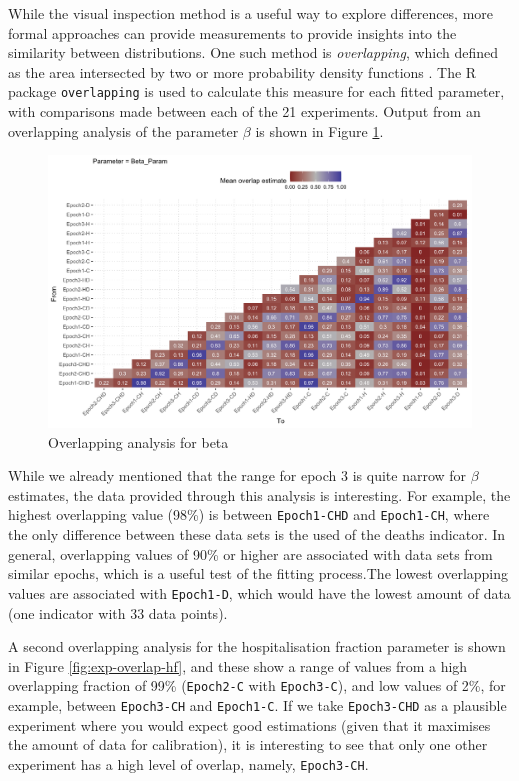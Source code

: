 \documentclass[10pt,letterpaper]{article}
\begin{document}
While the visual inspection method is a useful way to explore differences, more formal approaches can provide measurements to provide insights into the similarity between distributions. One such method is \emph{overlapping}, which deﬁned as the area intersected by two or more probability density functions \citep{10.3389/fpsyg.2019.01089}. The R package \texttt{overlapping} \citep{Pastore2018} is used to calculate this measure for each fitted parameter, with comparisons made between each of the 21 experiments. Output from an overlapping analysis of the parameter \(\beta\) is shown in Figure \ref{fig:exp-overlap-beta}.

\begin{figure}
\includegraphics[width=0.85\linewidth]{diagrams/exp_overlap_beta} \caption{Overlapping analysis for beta}\label{fig:exp-overlap-beta}
\end{figure}

While we already mentioned that the range for epoch 3 is quite narrow for \(\beta\) estimates, the data provided through this analysis is interesting. For example, the highest overlapping value (98\%) is between \texttt{Epoch1-CHD} and \texttt{Epoch1-CH}, where the only difference between these data sets is the used of the deaths indicator. In general, overlapping values of 90\% or higher are associated with data sets from similar epochs, which is a useful test of the fitting process.The lowest overlapping values are associated with \texttt{Epoch1-D}, which would have the lowest amount of data (one indicator with 33 data points).

A second overlapping analysis for the hospitalisation fraction parameter is shown in Figure \ref{fig:exp-overlap-hf}, and these show a range of values from a high overlapping fraction of 99\% (\texttt{Epoch2-C} with \texttt{Epoch3-C}), and low values of 2\%, for example, between \texttt{Epoch3-CH} and \texttt{Epoch1-C}. If we take \texttt{Epoch3-CHD} as a plausible experiment where you would expect good estimations (given that it maximises the amount of data for calibration), it is interesting to see that only one other experiment has a high level of overlap, namely, \texttt{Epoch3-CH}.
\end{document}
